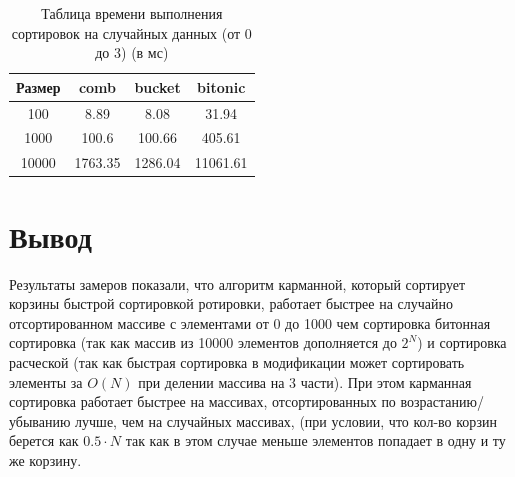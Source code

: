\documentclass[12pt]{report}
\begin{document}
	\begin{table} [h!]
		\caption{Таблица времени выполнения сортировок на случайных данных (от 0 до 3) (в мс)}
		\begin{center}
			\begin{tabular}{|c | c | c | c|}
				
				\hline
				
				Размер & comb & bucket & bitonic  \\ [0.5ex]
				
				\hline
				
				100 & 8.89 & 8.08 & 31.94 \\ 
				
				\hline 
				
				1000 & 100.6 & 100.66 & 405.61 \\ 
				
				\hline 
				
				10000 & 1763.35 & 1286.04 & 11061.61 \\ 
				
				\hline 
				
			\end{tabular}
		\end{center}
	\end{table}
	
	\begin{center}
	\end{center}
	

	\section{Вывод}
	
	Результаты замеров показали, что алгоритм карманной, который сортирует корзины быстрой сортировкой ротировки, работает быстрее на случайно отсортированном массиве с элементами от 0 до 1000 чем сортировка битонная сортировка  (так как массив из 10000 элементов дополняется до $2^N$) и сортировка расческой (так как быстрая сортировка в модификации может сортировать элементы за $O(N)$ при делении массива на 3 части). При этом карманная сортировка работает быстрее на массивах, отсортированных по возрастанию/убыванию лучше, чем на случайных массивах, (при условии, что кол-во корзин берется как $0.5 \cdot N$ так как в этом случае меньше элементов попадает в одну и ту же корзину. 
	
\end{document}
